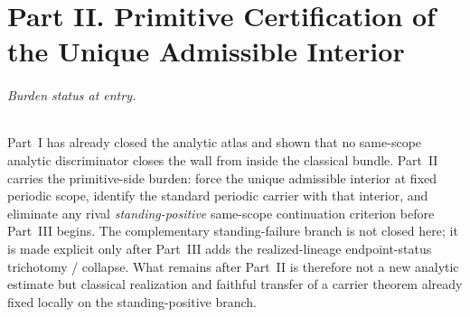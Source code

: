 \part*{Part II. Primitive Certification of the Unique Admissible Interior}

\paragraph{Burden status at entry.}
Part~I has already closed the analytic atlas and shown that no same-scope analytic discriminator closes the wall from inside the classical bundle. Part~II carries the primitive-side burden: force the unique admissible interior at fixed periodic scope, identify the standard periodic carrier with that interior, and eliminate any rival \emph{standing-positive} same-scope continuation criterion before Part~III begins. The complementary standing-failure branch is not closed here; it is made explicit only after Part~III adds the realized-lineage endpoint-status trichotomy / collapse. What remains after Part~II is therefore not a new analytic estimate but classical realization and faithful transfer of a carrier theorem already fixed locally on the standing-positive branch.

